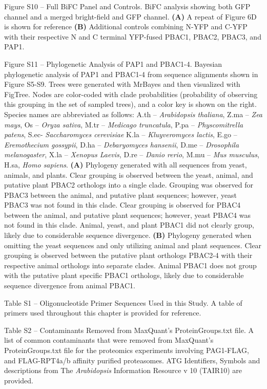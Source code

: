 Figure S10 – Full BiFC Panel and Controls. BiFC analysis showing both GFP channel and a merged bright-field and GFP channel. \textbf{(A)} A repeat of Figure 6D is shown for reference \textbf{(B)} Additional controls combining N-YFP and C-YFP with their respective N and C terminal YFP-fused PBAC1, PBAC2, PBAC3, and PAP1.

Figure S11 – Phylogenetic Analysis of PAP1 and PBAC1-4. Bayesian phylogenetic analysis of PAP1 and PBAC1-4 from sequence alignments shown in Figure S5-S9. Trees were generated with MrBayes \citep{ronquist12} and then visualized with FigTree. Nodes are color-coded with clade probabilities (probability of observing this grouping in the set of sampled trees), and a color key is shown on the right. Species names are abbreviated as follows: A.th – \textit{Arabidopsis thaliana}, Z.ma – \textit{Zea mays}, Os – \textit{Oryza sativa}, M.tr – \textit{Medicago truncatula}, P.pa – \textit{Physcomitrella patens}, S.ec- \textit{Saccharomyces cerevisiae} K.la – \textit{Kluyveromyces lactis}, E.go – \textit{Eremothecium gossypii}, D.ha – \textit{Debaryomyces hansenii}, D.me – \textit{Drosophila melanogaster}, X.la – \textit{Xenopus Laevis}, D.re – \textit{Danio rerio}, M.mu – \textit{Mus musculus}, H.sa, \textit{Homo sapiens}. \textbf{(A)} Phylogeny generated with all sequences from yeast, animals, and plants. Clear grouping is observed between the yeast, animal, and putative plant PBAC2 orthologs into a single clade. Grouping was observed for PBAC3 between the animal, and putative plant sequences; however, yeast PBAC3 was not found in this clade. Clear grouping is observed for PBAC4 between the animal, and putative plant sequences; however, yeast PBAC4 was not found in this clade. Animal, yeast, and plant PBAC1 did not clearly group, likely due to considerable sequence divergence. \textbf{(B)} Phylogeny generated when omitting the yeast sequences and only utilizing animal and plant sequences. Clear grouping is observed between the putative plant orthologs PBAC2-4 with their respective animal orthologs into separate clades. Animal PBAC1 does not group with the putative plant specific PBAC1 orthologs, likely due to considerable sequence divergence from animal PBAC1.

Table S1 – Oligonucleotide Primer Sequences Used in this Study. A table of primers used throughout this chapter is provided for reference.

Table S2 – Contaminants Removed from MaxQuant’s ProteinGroups.txt file. A list of common contaminants that were removed from MaxQuant’s ProteinGroups.txt file for the proteomics experiments involving PAG1-FLAG, and FLAG-RPT4a/b affinity purified proteasomes.  ATG Identifiers, Symbols and descriptions from The \textit{Arabidopsis} Information Resource v 10 (TAIR10) are provided.


